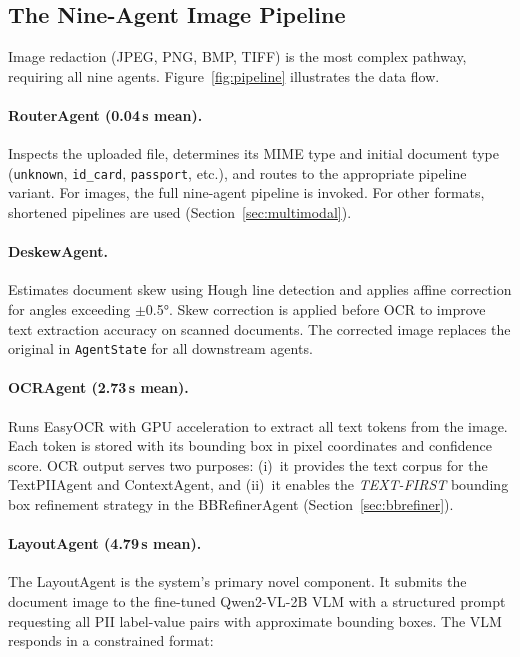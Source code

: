 \documentclass[conference]{IEEEtran}
\begin{document}
\subsection{The Nine-Agent Image Pipeline}

Image redaction (JPEG, PNG, BMP, TIFF) is the most
complex pathway, requiring all nine agents.
Figure~\ref{fig:pipeline} illustrates the data flow.

\paragraph{RouterAgent (0.04\,s mean).}
Inspects the uploaded file, determines its MIME type
and initial document type (\texttt{unknown},
\texttt{id\_card}, \texttt{passport}, etc.),
and routes to the appropriate pipeline variant.
For images, the full nine-agent pipeline is invoked.
For other formats, shortened pipelines are used
(Section~\ref{sec:multimodal}).

\paragraph{DeskewAgent.}
Estimates document skew using Hough line detection
and applies affine correction for angles exceeding
$\pm$0.5°.
Skew correction is applied before OCR to improve text
extraction accuracy on scanned documents.
The corrected image replaces the original in
\texttt{AgentState} for all downstream agents.

\paragraph{OCRAgent (2.73\,s mean).}
Runs EasyOCR with GPU acceleration to extract
all text tokens from the image.
Each token is stored with its bounding box in pixel
coordinates and confidence score.
OCR output serves two purposes: (i)~it provides the
text corpus for the TextPIIAgent and ContextAgent,
and (ii)~it enables the \emph{TEXT-FIRST} bounding
box refinement strategy in the BBRefinerAgent
(Section~\ref{sec:bbrefiner}).

\paragraph{LayoutAgent (4.79\,s mean).}
The LayoutAgent is the system's primary novel
component.
It submits the document image to the fine-tuned
Qwen2-VL-2B VLM with a structured prompt requesting
all PII label-value pairs with approximate bounding
boxes.
The VLM responds in a constrained format:
\end{document}
